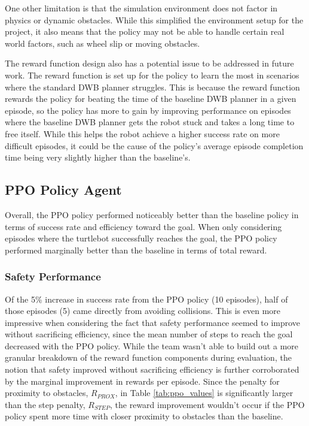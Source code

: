\documentclass[conference]{IEEEtran}
\begin{document}
        One other limitation is that the simulation environment does not factor in physics or dynamic obstacles. While this simplified the environment setup for the project, it also means that the policy may not be able to handle certain real world factors, such as wheel slip or moving obstacles.

        The reward function design also has a potential issue to be addressed in future work. The reward function is set up for the policy to learn the most in scenarios where the standard DWB planner struggles. This is because the reward function rewards the policy for beating the time of the baseline DWB planner in a given episode, so the policy has more to gain by improving performance on episodes where the baseline DWB planner gets the robot stuck and takes a long time to free itself. While this helps the robot achieve a higher success rate on more difficult episodes, it could be the cause of the policy's average episode completion time being very slightly higher than the baseline's.
    
    \subsection{PPO Policy Agent}
    Overall, the PPO policy performed noticeably better than the baseline policy in terms of success rate and efficiency toward the goal. When only considering episodes where the turtlebot successfully reaches the goal, the PPO policy performed marginally better than the baseline in terms of total reward.

        \subsubsection{Safety Performance}
        Of the 5\% increase in success rate from the PPO policy (10 episodes), half of those episodes (5) came directly from avoiding collisions. This is even more impressive when considering the fact that safety performance seemed to improve without sacrificing efficiency, since the mean number of steps to reach the goal decreased with the PPO policy. While the team wasn't able to build out a more granular breakdown of the reward function components during evaluation, the notion that safety improved without sacrificing efficiency is further corroborated by the marginal improvement in rewards per episode. Since the penalty for proximity to obstacles, $R_{PROX}$, in Table \ref{tab:ppo_values} is significantly larger than the step penalty, $R_{STEP}$, the reward improvement wouldn't occur if the PPO policy spent more time with closer proximity to obstacles than the baseline.
\end{document}
